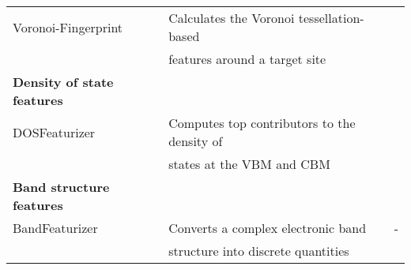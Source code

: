 \begin{center}
\begin{longtable}{M{4.0cm} M{7.5cm} M{2.0cm}}
  Voronoi-Fingerprint & Calculates the Voronoi tessellation-based  & \cite{Peng2011,Wang2019} \\
   & features around a target site & \\ 
\hline     
  \textbf{Density of state features} & & \\
  DOSFeaturizer & Computes top contributors to the density of  & \cite{Dylla2020} \\ 
  & states at the VBM and CBM  & \\ 
  \hline  
  \textbf{Band structure features} & & \\
  BandFeaturizer & Converts a complex electronic band  & - \\ 
   &structure into discrete quantities  & \\ 
\hline 
\end{longtable}
\end{center}